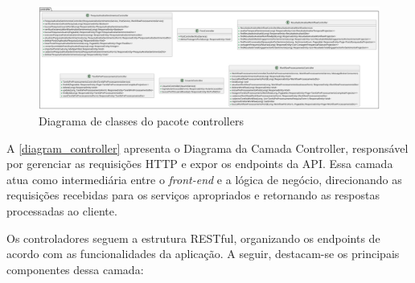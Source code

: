 \documentclass[
	12pt,				%
	oneside,			%
	a4paper,			%
	english,			%
	french,				%
	spanish,			%
	brazil				%
	]{abntex2}
\begin{document}
\begin{figure}[htbp]
\hypertarget{diagram_controller}{%
\caption{Diagrama de classes do pacote controllers}\label{diagram_controller}
\begin{center}
\includegraphics[scale=0.2]{imagens/sentilytics/diagramas/classes/controller-classes.png}
\end{center}
}
\end{figure}

A \autoref{diagram_controller} apresenta o Diagrama da Camada
Controller, responsável por gerenciar as requisições HTTP e expor os
endpoints da API. Essa camada atua como intermediária entre o
\emph{front-end} e a lógica de negócio, direcionando as requisições
recebidas para os serviços apropriados e retornando as respostas
processadas ao cliente.

Os controladores seguem a estrutura RESTful, organizando os endpoints de
acordo com as funcionalidades da aplicação. A seguir, destacam-se os
principais componentes dessa camada:
\end{document}
